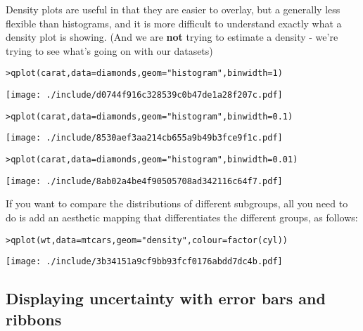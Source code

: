 Density plots are useful in that they are easier to overlay, but a generally less flexible than histograms, and it is more difficult to understand exactly what a density plot is showing.  (And we are {\bf not} trying to estimate a density - we're trying to see what's going on with our datasets)

\begin{alltt}
> qplot(carat, data = diamonds, geom = "histogram", binwidth = 1)
\end{alltt}
\texttt{[image: ./include/d0744f916c328539c0b47de1a28f207c.pdf]}
\begin{alltt}

> qplot(carat, data = diamonds, geom = "histogram", binwidth = 0.1)
\end{alltt}
\texttt{[image: ./include/8530aef3aa214cb655a9b49b3fce9f1c.pdf]}
\begin{alltt}

> qplot(carat, data = diamonds, geom = "histogram", binwidth = 0.01)
\end{alltt}
\texttt{[image: ./include/8ab02a4be4f90505708ad342116c64f7.pdf]}
\begin{alltt}

\end{alltt}

If you want to compare the distributions of different subgroups, all you need to do is add an aesthetic mapping that differentiates the different groups, as follows:

\begin{alltt}
> qplot(wt, data = mtcars, geom = "density", colour = factor(cyl))
\end{alltt}
\texttt{[image: ./include/3b34151a9cf9bb93fcf0176abdd7dc4b.pdf]}
\begin{alltt}

\end{alltt}

\subsection{Displaying uncertainty with error bars and ribbons}\label{sub:error_bars}

